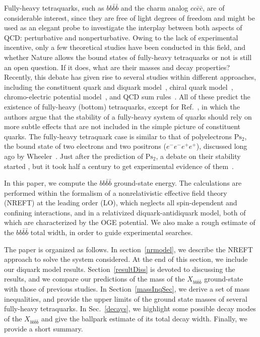 \documentclass[twocolumn,showpacs,superscriptaddress,preprintnumbers,nofootinbib,prd]{revtex4-1}
\begin{document}
Fully-heavy tetraquarks, such as $bb\bar{b}\bar{b}$ and the charm analog
$cc\bar{c}\bar{c}$, are of considerable interest, since they are free of light
degrees of freedom and might be used as an elegant probe to investigate the interplay
between both aspects of QCD: perturbative and nonperturbative. Owing to the lack
of experimental incentive, only a few theoretical studies have been conducted in this
field, and whether Nature allows the bound states of fully-heavy tetraquarks or
not is still an open question.
If it does, what are their masses and decay properties? Recently, this debate has given rise to
several studies within different approaches, including the constituent quark and diquark model~\cite{Bai:2016int,Eichten:2017ual,Karliner:2016zzc,Berezhnoy:2011xn},
chiral quark model~\cite{Wu:2016vtq}, chromo-electric potential model~\cite{Richard:2017vry}, and QCD sum
rules~\cite{Chen:2016jxd,Wang:2017jtz}. All of these predict the existence of
fully-heavy (bottom) tetraquarks, except for Ref.~\cite{Richard:2017vry}, in which
the authors argue that the stability of a fully-heavy system of quarks should rely on more subtle effects
that are not included in the simple picture of constituent quarks.
The fully-heavy tetraquark case is similar to that of polyelectrons
$\textrm{Ps}_{2}$, the bound state of two electrons and two positrons ($e^- e^- e^+ e^+$), discussed
long ago by Wheeler~\cite{Wheeler:1946zz}. Just after the prediction of $\textrm{Ps}_{2}$, a debate on their stability started
\cite{Ore:1946zz,Hylleraas:1947zza}, but it took half a century to get experimental
evidence of them~\cite{Nature:2007}.

In this paper, we compute the $b b \bar b \bar b$ ground-state energy. The
calculations are performed within the formalism of a nonrelativistic effective
field theory (NREFT) at the leading order (LO), which neglects all
spin-dependent and confining interactions, and in a relativized
diquark-antidiquark model, both of which are characterized by the OGE potential.
We also make a rough estimate of the $b b \bar b \bar b$ total width, in order to guide experimental
searches.

The paper is organized as follows. In section~\ref{nrmodel}, we describe the
NREFT approach to solve the system considered.
At the end of this section, we include our diquark model results.
Section~\ref{resultDiss} is devoted to discussing the results, and we compare
our predictions of the mass of the $X_{bb\bar{b}\bar{b}}$ ground-state with those
of previous studies. In Section~\ref{massInqSec}, we derive a set of mass
inequalities, and provide the upper limits of the ground state masses of several
fully-heavy tetraquarks.
In Sec.~\ref{decays}, we highlight some possible decay
modes of the $X_{bb\bar{b}\bar{b}}$ and give the ballpark estimate of its total
decay width. Finally, we provide a short summary.
\end{document}
